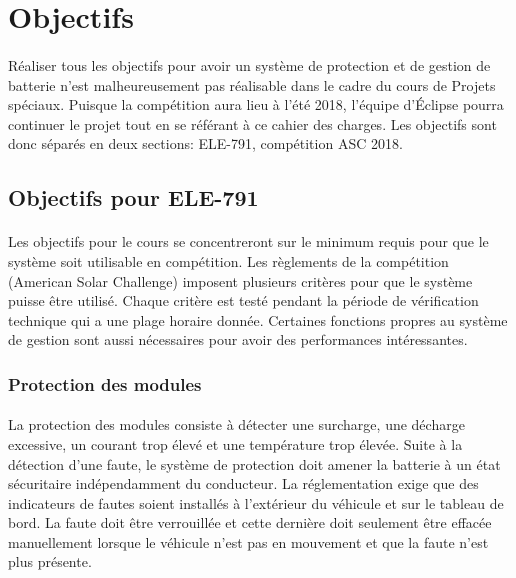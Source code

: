 
\section{Objectifs}
	\paragraph{}
	Réaliser tous les objectifs pour avoir un système de protection et de gestion de batterie  n'est malheureusement pas réalisable dans le cadre du cours de Projets spéciaux. Puisque la compétition aura lieu à l'été 2018, l'équipe d'Éclipse pourra continuer le projet tout en se référant à ce cahier des charges. Les objectifs sont donc séparés en deux sections: ELE-791, compétition ASC 2018.  

	\subsection{Objectifs pour ELE-791}

		\paragraph{}	
		Les objectifs pour le cours se concentreront sur le minimum requis pour que le système soit utilisable en compétition. Les règlements de la compétition (American Solar Challenge) imposent plusieurs critères pour que le système puisse être utilisé. Chaque critère est testé pendant la période de vérification technique qui a une plage horaire donnée. Certaines fonctions propres au système de gestion sont aussi nécessaires pour avoir des performances intéressantes.
		
	\subsubsection{Protection des modules} \label{protection_module}

		\paragraph{}
		La protection des modules consiste à détecter une surcharge, une décharge excessive, un courant trop élevé et une température trop élevée. Suite à la détection d'une faute, le système de protection doit amener la batterie à un état sécuritaire indépendamment du conducteur. La réglementation exige que des indicateurs de fautes soient installés à l'extérieur du véhicule et sur le tableau de bord. La faute doit être verrouillée et cette dernière doit seulement être effacée manuellement lorsque le véhicule n'est pas en mouvement et que la faute n'est plus présente.
		
